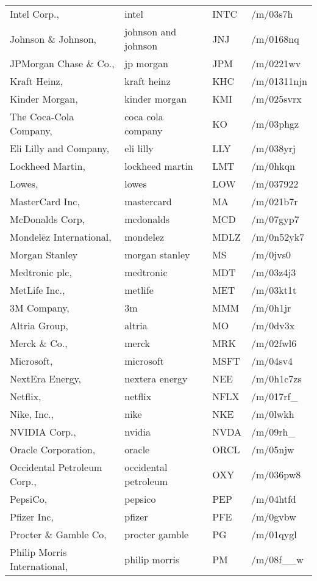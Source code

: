 \begin{longtable}[c]{llll}
Intel Corp., & intel & INTC & /m/03s7h \\
Johnson \& Johnson, & johnson and johnson & JNJ & /m/0168nq \\
JPMorgan Chase \& Co., & jp morgan & JPM & /m/0221wv \\
Kraft Heinz, & kraft heinz & KHC & /m/01311njn \\
Kinder Morgan, & kinder morgan & KMI & /m/025svrx \\
The Coca-Cola Company, & coca cola company & KO & /m/03phgz \\
Eli Lilly and Company, & eli lilly & LLY & /m/038yrj \\
Lockheed Martin, & lockheed martin & LMT & /m/0hkqn \\
Lowes, & lowes & LOW & /m/037922 \\
MasterCard Inc, & mastercard & MA & /m/021b7r \\
McDonalds Corp, & mcdonalds & MCD & /m/07gyp7 \\
Mondelēz International, & mondelez & MDLZ & /m/0n52yk7 \\
Morgan Stanley & morgan stanley & MS & /m/0jvs0 \\
Medtronic plc, & medtronic & MDT & /m/03z4j3 \\
MetLife Inc., & metlife & MET & /m/03kt1t \\
3M Company, & 3m & MMM & /m/0h1jr \\
Altria Group, & altria & MO & /m/0dv3x \\
Merck \& Co., & merck & MRK & /m/02fwl6 \\
Microsoft, & microsoft & MSFT & /m/04sv4 \\
NextEra Energy, & nextera energy & NEE & /m/0h1c7zs \\
Netflix, & netflix & NFLX & /m/017rf\_ \\
Nike, Inc., & nike & NKE & /m/0lwkh \\
NVIDIA Corp., & nvidia & NVDA & /m/09rh\_ \\
Oracle Corporation, & oracle & ORCL & /m/05njw \\
Occidental Petroleum Corp., & occidental petroleum & OXY & /m/036pw8 \\
PepsiCo, & pepsico & PEP & /m/04htfd \\
Pfizer Inc, & pfizer & PFE & /m/0gvbw \\
Procter \& Gamble Co, & procter gamble & PG & /m/01qygl \\
Philip Morris International, & philip morris & PM & /m/08f\_\_w \\

\end{longtable}
